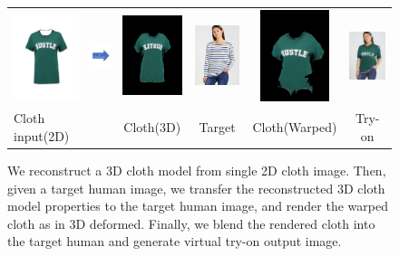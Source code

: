 \begin{figure}[t]
\begin{tabular}{lccccc}
\includegraphics[width=2cm]{figures/c2dw/000005_1.png}&
\includegraphics[width=2cm]{figures/arrow_recon.png}&
\includegraphics[width=2cm]{figures/c3drecon/000005_1_000303_0.png}&
\includegraphics[width=2cm]{figures/image/000303_0.jpg}&
\includegraphics[width=2cm]{figures/c3dwfull/000005_1_000303_0.png}&
\includegraphics[width=2cm]{figures/try-on/000005_1_000303_0.jpg}\\

  Cloth input(2D)&&Cloth(3D)&Target&Cloth(Warped)&Try-on\\

\end{tabular}

    \caption{We reconstruct a 3D cloth model from single 2D cloth image. Then, given a target human image, we transfer the reconstructed 3D cloth model properties to the target human image, and render the warped cloth as in 3D deformed. Finally, we blend the rendered cloth into the target human and generate virtual try-on output image.}
    \label{fig:summary}
\end{figure}



